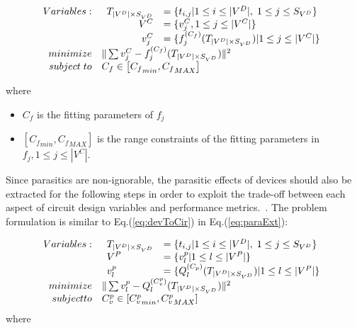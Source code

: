    {\footnotesize
    \begin{align}\label{eq:devToCir}
      \begin{array}[t]{rl}
        Variables: & \begin{array}[t]{rl}
                      T_{|V^D| \times S_{V^D}}  & = \{t_{i,j}| 1 \leq i \leq |V^D|,\; 1 \leq j \leq S_{V^D}\}   \\
                      V^C   &= \{v_j^C, 1\leq j \leq |V^C| \}   \\
                      v_j^C &= \{f_j^{(C_f)}(T_{|V^D| \times S_{V^D}})|1 \leq j \leq |V^C|\}  \\
                    \end{array} \\
         minimize & \| \sum{ v_j^C - f_j^{(C_f)}(T_{|V^D| \times S_{V^D}})}\|^2   \\
       subject\; to & C_f\in \left [{C_f}_{min}, {C_f}_{MAX} \right] 
      \end{array} 
    \end{align}}
    
    
    where
    \begin{itemize}
      \item $C_f$ is the fitting parameters of $f_j$ 
      \item $\left [{C_f}_{min},{C_f}_{MAX}\right]$ is the range constraints of the fitting parameters in $f_j, 1 \leq j \leq |V^C|$.
    \end{itemize}

    Since parasitics are non-ignorable, the parasitic effects of devices should also be extracted for the following steps in order to exploit the trade-off between each aspect of circuit design variables and performance metrics.~\cite{Template_Based_Parasitic_Aware_Layout}. The problem formulation is similar to Eq.(\ref{eq:devToCir}) in Eq.(\ref{eq:paraExt}):
  
    \vspace{0.3cm}
    {\footnotesize
      \begin{align}\label{eq:paraExt}
        \begin{array}[t]{rl}
        Variables:  & \begin{array}[t]{ll}
                        T_{|V^D| \times S_{V^D}} &= \{t_{i,j}| 1 \leq i \leq |V^D|,\; 1 \leq j \leq S_{V^D}\}   \\
                        V^P     & = \{v^p_l|1 \leq l \leq |V^P|\} \\
                        v^p_l   & = \{Q_l^{(C_p)}(T_{|V^D| \times S_{V^D}})| 1 \leq l \leq |V^P| \}
                      \end{array} \\
        minimize    &  \| \sum{v^p_l-Q_l^{(C_v^p)}(T_{|V^D| \times S_{V^D}})}\|^2  \\
        subject to  &  C_v^p \in \left [ {C_v^p}_{min}, {C_v^p}_{MAX}\right] 
        \end{array} 
      \end{align}
    }
    where


